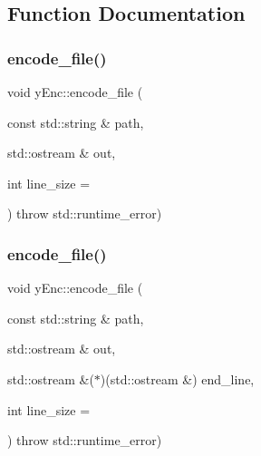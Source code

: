 \subsection{Function Documentation}
\hypertarget{namespacey_enc_aeb955c32dcf385759351e2792472819e}{}\label{namespacey_enc_aeb955c32dcf385759351e2792472819e} 
\subsubsection{\texorpdfstring{encode\+\_\+file()}{encode\_file()}\hspace{0.1cm}{\footnotesize\ttfamily [1/2]}}
{\footnotesize\ttfamily void y\+Enc\+::encode\+\_\+file (\begin{DoxyParamCaption}\item[{const std\+::string \&}]{path,  }\item[{std\+::ostream \&}]{out,  }\item[{int}]{line\+\_\+size = {} }\end{DoxyParamCaption}) throw  std\+::runtime\+\_\+error) }

\hypertarget{namespacey_enc_a2f5357e2cf810e07ffdbdd631b4d65b6}{}\label{namespacey_enc_a2f5357e2cf810e07ffdbdd631b4d65b6} 
\subsubsection{\texorpdfstring{encode\+\_\+file()}{encode\_file()}\hspace{0.1cm}{\footnotesize\ttfamily [2/2]}}
{\footnotesize\ttfamily void y\+Enc\+::encode\+\_\+file (\begin{DoxyParamCaption}\item[{const std\+::string \&}]{path,  }\item[{std\+::ostream \&}]{out,  }\item[{std\+::ostream \&($\ast$)(std\+::ostream \&)}]{end\+\_\+line,  }\item[{int}]{line\+\_\+size = {} }\end{DoxyParamCaption}) throw  std\+::runtime\+\_\+error) }

\hypertarget{namespacey_enc_a829a7c38464eb09e2c1d210668c6207a}{}\label{namespacey_enc_a829a7c38464eb09e2c1d210668c6207a} 
